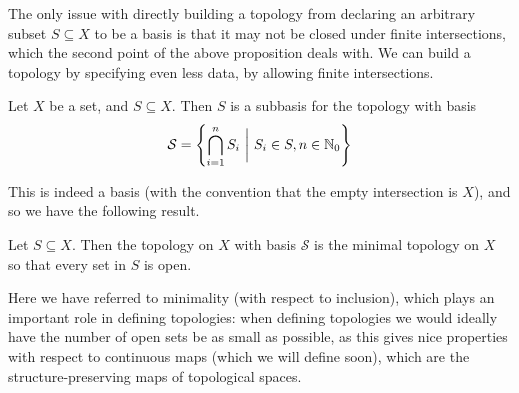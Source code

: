 \documentclass[11pt]{article}
\begin{document}
The only issue with directly building a topology from declaring an arbitrary subset $S \subseteq X$ to be a basis is that it may not be closed under finite intersections, which the second point of the above proposition deals with. We can build a topology by specifying even less data, by allowing finite intersections.
\begin{definition}[Subbasis]
    Let $X$ be a set, and $S \subseteq X$. Then $S$ is a subbasis for the topology with basis
    $$
        \mathcal{S} = \left\{  \bigcap_{i = 1}^n S_i \ \bigg| \ S_i \in S, n \in \mathbb{N}_0  \right\}
    $$
\end{definition}
This is indeed a basis (with the convention that the empty intersection is $X$), and so we have the following result.
\begin{lemma}
    Let $S \subseteq X$. Then the topology on $X$ with basis $\mathcal{S}$ is the minimal topology on $X$ so that every set in $S$ is open.
\end{lemma}
Here we have referred to minimality (with respect to inclusion), which plays an important role in defining topologies: when defining topologies we would ideally have the number of open sets be as small as possible, as this gives nice properties with respect to continuous maps (which we will define soon), which are the structure-preserving maps of topological spaces. 

\end{document}
